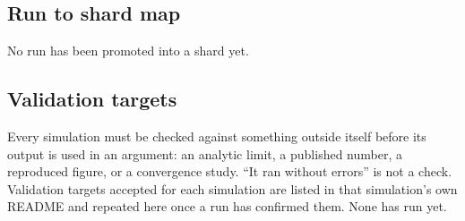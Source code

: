\subsection*{Run to shard map}

No run has been promoted into a shard yet.

\subsection*{Validation targets}

Every simulation must be checked against something outside itself before its output is used in an
argument: an analytic limit, a published number, a reproduced figure, or a convergence study.
``It ran without errors'' is not a check. Validation targets accepted for each simulation are
listed in that simulation's own README and repeated here once a run has confirmed them. None has
run yet.
